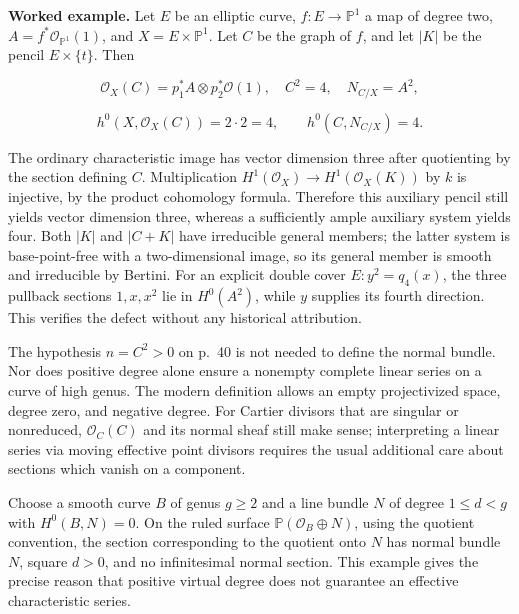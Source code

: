 \textbf{Worked example.} Let \(E\) be an elliptic curve, \(f:E\to\mathbb P^1\) a map of degree two, \(A=f^*\mathcal O_{\mathbb P^1}(1)\), and \(X=E\times\mathbb P^1\). Let \(C\) be the graph of \(f\), and let \(|K|\) be the pencil \(E\times\{t\}\). Then

\[
\mathcal O_X(C)=p_1^*A\otimes p_2^*\mathcal O(1),\quad
C^2=4,\quad N_{C/X}=A^2,
\]

\[
h^0(X,\mathcal O_X(C))=2\cdot2=4,\qquad
h^0(C,N_{C/X})=4.
\]

The ordinary characteristic image has vector dimension three after quotienting by the section defining \(C\). Multiplication \(H^1(\mathcal O_X)\to H^1(\mathcal O_X(K))\) by \(k\) is injective, by the product cohomology formula. Therefore this auxiliary pencil still yields vector dimension three, whereas a sufficiently ample auxiliary system yields four. Both \(|K|\) and \(|C+K|\) have irreducible general members; the latter system is base-point-free with a two-dimensional image, so its general member is smooth and irreducible by Bertini. For an explicit double cover \(E:y^2=q_4(x)\), the three pullback sections \(1,x,x^2\) lie in \(H^0(A^2)\), while \(y\) supplies its fourth direction. This verifies the defect without any historical attribution.

The hypothesis \(n=C^2>0\) on p.~40 is not needed to define the normal bundle. Nor does positive degree alone ensure a nonempty complete linear series on a curve of high genus. The modern definition allows an empty projectivized space, degree zero, and negative degree. For Cartier divisors that are singular or nonreduced, \(\mathcal O_C(C)\) and its normal sheaf still make sense; interpreting a linear series via moving effective point divisors requires the usual additional care about sections which vanish on a component.

\begin{example}
Choose a smooth curve \(B\) of genus \(g\ge2\) and a line bundle \(N\) of degree \(1\le d<g\) with \(H^0(B,N)=0\). On the ruled surface \(\mathbb P(\mathcal O_B\oplus N)\), using the quotient convention, the section corresponding to the quotient onto \(N\) has normal bundle \(N\), square \(d>0\), and no infinitesimal normal section. This example gives the precise reason that positive virtual degree does not guarantee an effective characteristic series.
\end{example}

